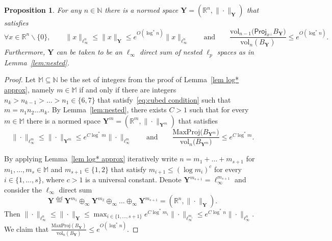 \documentclass[11pt,reqno]{amsart}
\renewcommand{\le}{\leqslant}
\renewcommand{\setminus}{\smallsetminus}
\newcommand{\proj}{\mathsf{Proj}}
\newcommand{\Y}{\mathbf Y}
\newcommand{\R}{\mathbb R}
\newtheorem{proposition}[theorem]{Proposition}
\theoremstyle{remark}
\renewcommand{\subset}{\subseteq}
\newcommand{\N}{\mathbb N}
\newcommand{\eqdef}{\stackrel{\mathrm{def}}{=}}
\newcommand{\vol}{\mathrm{vol}}
\renewcommand{\1}{\mathbf 1}
\begin{document}
\begin{proposition}\label{prop:slightly less rounded cube} For any $n\in \N$ there is a normed space $\Y=(\R^n,\|\cdot\|_\Y)$ that satisfies
\begin{equation*}\label{eq:round cube'}
\forall x\in \R^n\setminus \{0\},\qquad  \|x\|_{\ell_\infty^n}\le \|x\|_\Y\le e^{O(\log^*\!\! n)}\|x\|_{\ell_\infty^n}\qquad \mathrm{and}\qquad \frac{\vol_{n-1}\big(\proj_{x^\perp}B_{\Y}\big)}{\vol_n(B_{\Y})}\le  e^{O(\log^*\!\! n)}.
\end{equation*}
Furthermore, $\Y$ can be taken to be an $\ell_\infty$ direct sum of nested $\ell_p$ spaces as in Lemma~\ref{lem:nested}.
\end{proposition}

\begin{proof} Let $\mathbb{M}\subset \N$ be the set of integers from the proof of Lemma~\ref{lem log* approx}, namely $m\in \mathbb{M}$ if and only if there are integers $n_k>n_{k-1}>\ldots >n_1\in \{6,7\}$ that satisfy~\eqref{eq:cubed condition} such that $m=n_1n_2\ldots n_k$. By Lemma~\ref{lem:nested}, there exists $C>1$ such that for every $m\in \mathbb{M}$ there is a normed space $\Y^m=(\R^m,\|\cdot\|_{\Y^m})$ that satisfies
$$
\|\cdot\|_{\ell_\infty^m}\le \|\cdot\|_{\Y^m}\le e^{C\log^*\!\! m}\|\cdot\|_{\ell_\infty^m} \qquad \mathrm{and}\qquad  \frac{\mathrm{MaxProj}\big(B_{\Y^m}\big)}{\vol_n\big(B_{\Y^m}\big)}\le e^{C\log^*\!\! m}.
$$

By applying Lemma~\ref{lem log* approx} iteratively  write $n=m_1+\ldots+m_{s+1}$ for  $m_1,\ldots,m_s\in \mathbb{M}$ and $m_{s+1}\in \{1,2\}$ that satisfy $m_{i+1}\le (\log m_i)^c$ for every $i\in \{1,\ldots,s\}$, where $c>1$ is a universal constant. Denote $\Y^{m_{s+1}}=\ell_\infty^{m_{s+1}}$ and consider the $\ell_\infty$ direct sum
$$
\Y\eqdef \Y^{m_1}\oplus_\infty \Y^{m_2}\oplus_\infty\ldots\oplus_\infty \Y^{m_{s+1}}=(\R^n,\|\cdot\|_{\Y}).
$$
Then $\|\cdot\|_{\ell_\infty^n}\le \|\cdot\|_\Y\le \max_{i\in \{1,\ldots,s+1\}} e^{C\log^*\!\! m_i}\|\cdot\|_{\ell_\infty^{m_i}}\le e^{C\log^*\!\! n}\|\cdot\|_{\ell_\infty^n}$. We claim that $\frac{\mathrm{MaxProj}(B_\Y)}{\vol_n(B_\Y)}\le e^{O(\log^*\!\! n)}$.




\end{proof}
\end{document}
